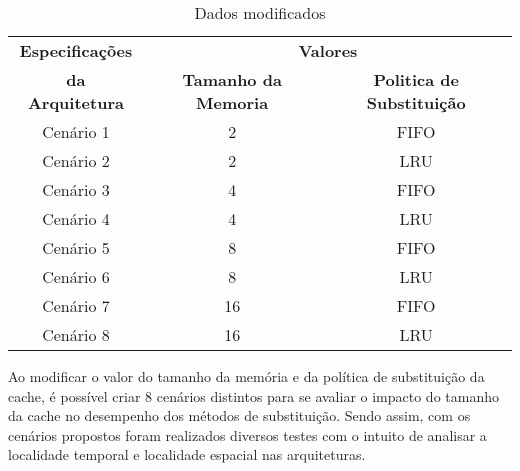     \begin{table}[!t]
    \caption{Dados modificados}
    \centering
        \begin{tabular}{|c|c|c|}
            \hline
            \textbf{Especificações} & \multicolumn{2}{|c|}{\textbf{Valores}} \\
            \cline{2-3} 
            \textbf{da Arquitetura} & \textbf{Tamanho da Memoria} & \textbf{Politica de Substituição} \\
            \hline
            Cenário 1 & 2 & FIFO \\
            \hline
            Cenário 2 & 2 & LRU \\
            \hline
            Cenário 3 & 4 & FIFO\\
            \hline
            Cenário 4 & 4 & LRU\\
            \hline
            Cenário 5 & 8 & FIFO\\
            \hline
            Cenário 6 & 8 & LRU\\
            \hline
            Cenário 7 & 16 & FIFO\\
            \hline
            Cenário 8 & 16 & LRU\\
            \hline
        \end{tabular}
        \label{tab3}
    \end{table}

    Ao modificar o valor do tamanho da memória e da política de substituição da cache,
    é possível criar 8 cenários distintos para se avaliar o impacto do tamanho da cache
    no desempenho dos métodos de substituição. Sendo assim, com os cenários propostos
    foram realizados diversos testes com o intuito de analisar a localidade temporal e
    localidade espacial nas arquiteturas.